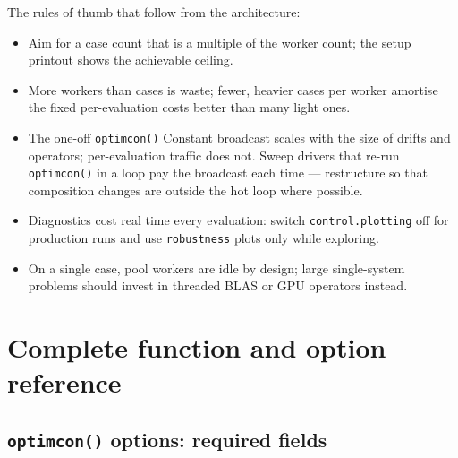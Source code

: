 \documentclass[11pt,a4paper]{article}
\newcommand{\code}[1]{\texttt{#1}}
\begin{document}
The rules of thumb that follow from the architecture:
\begin{itemize}
\item Aim for a case count that is a multiple of the worker count; the
  setup printout shows the achievable ceiling.
\item More workers than cases is waste; fewer, heavier cases per worker
  amortise the fixed per-evaluation costs better than many light ones.
\item The one-off \code{optimcon()} Constant broadcast scales with the
  size of drifts and operators; per-evaluation traffic does not. Sweep
  drivers that re-run \code{optimcon()} in a loop pay the broadcast each
  time --- restructure so that composition changes are outside the hot
  loop where possible.
\item Diagnostics cost real time every evaluation: switch
  \code{control.plotting} off for production runs and use
  \code{robustness} plots only while exploring.
\item On a single case, pool workers are idle by design; large
  single-system problems should invest in threaded BLAS or GPU operators
  instead.
\end{itemize}

\section{Complete function and option reference}
\label{sec:reference}

\subsection{\code{optimcon()} options: required fields}
\end{document}

